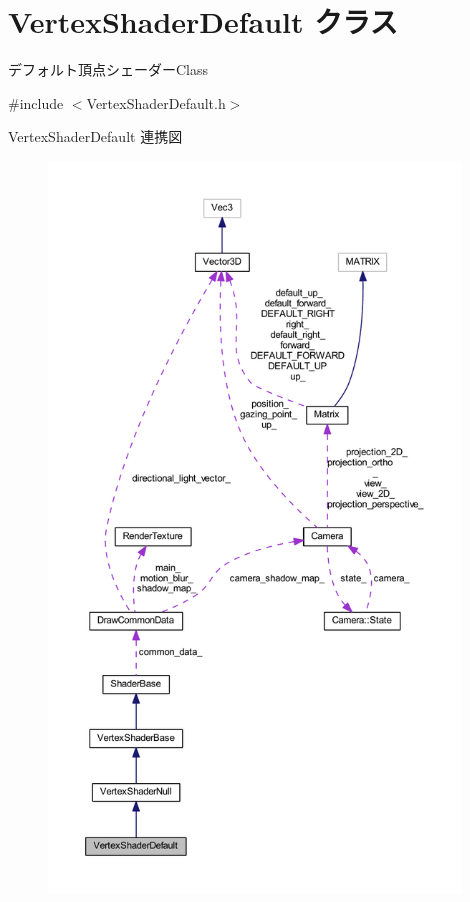 \hypertarget{class_vertex_shader_default}{}\section{Vertex\+Shader\+Default クラス}
\label{class_vertex_shader_default}


デフォルト頂点シェーダー\+Class  




{\ttfamily \#include $<$Vertex\+Shader\+Default.\+h$>$}



Vertex\+Shader\+Default 連携図\nopagebreak
\begin{figure}[H]
\begin{center}
\leavevmode
\includegraphics[height=550pt]{class_vertex_shader_default__coll__graph}
\end{center}
\end{figure}
